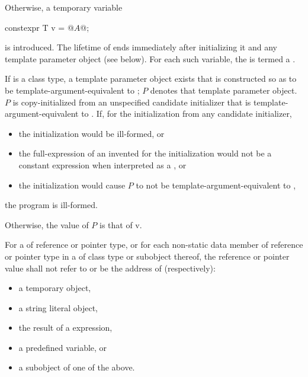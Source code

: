 \documentclass{wg21}
\begin{document}
\pnum
Otherwise, a temporary variable
\begin{codeblock}
    constexpr T v = @$A$@;
\end{codeblock}
is introduced.
The lifetime of  ends immediately after initializing it and
any template parameter object (see below).
For each such variable,
the  
is termed a .

\pnum
If  is a class type,
a template parameter object exists
that is constructed so as to be template-argument-equivalent to ;
$P$ denotes that template parameter object.
$P$ is copy-initialized from an unspecified candidate initializer
that is template-argument-equivalent to .
If, for the initialization from any candidate initializer,
\begin{itemize}
    \item
    the initialization would be ill-formed, or
    \item
    the full-expression of an invented 
    for the initialization would not be a constant expression
    when interpreted as a , or
    \item
    the initialization would cause $P$ to not be template-argument-equivalent to ,
\end{itemize}
the program is ill-formed.

\pnum
Otherwise, the value of $P$ is that of v.

\pnum
For a   of reference or pointer type,
or for each non-static data member of reference or pointer type
in a   of class type or subobject thereof,
the reference or pointer value shall not refer to
or be the address of (respectively):
\begin{itemize}
    \item a temporary object,
    \item a string literal object,
    \item the result of a  expression,
    \item a predefined  variable, or
    \item a subobject of one of the above.
\end{itemize}
\end{document}
